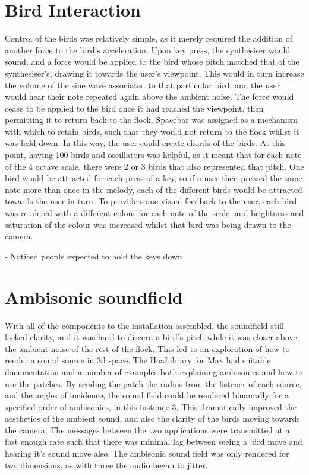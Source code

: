 \documentclass[journal, a4paper]{IEEEtran}
\begin{document}
\section*{Bird Interaction}
Control of the birds was relatively simple, as it merely required the addition of another force to the bird's acceleration. Upon key press, the synthesiser would sound, and a force would be applied to the bird whose pitch matched that of the synthesiser's, drawing it towards the user's viewpoint. This would in turn increase the volume of the sine wave associated to that particular bird, and the user would hear their note repeated again above the ambient noise. The force would cease to be applied to the bird once it had reached the viewpoint, then permitting it to return back to the flock.
Spacebar was assigned as a mechanism with which to retain birds, such that they would not return to the flock whilst it was held down. In this way, the user could create chords of the birds. At this point, having 100 birds and oscillators was helpful, as it meant that for each note of the 4 octave scale, there were 2 or 3 birds that also represented that pitch. One bird would be attracted for each press of a key, so if a user then pressed the same note more than once in the melody, each of the different birds would be attracted towards the user in turn.
To provide some visual feedback to the user, each bird was rendered with a different colour for each note of the scale, and brightness and saturation of the colour was increased whilst that bird was being drawn to the camera.

- Noticed people expected to hold the keys down

\section*{Ambisonic soundfield}
With all of the components to the installation assembled, the soundfield still lacked clarity, and it was hard to discern a bird's pitch while it was closer above the ambient noise of the rest of the flock. This led to an exploration of how to render a sound source in 3d space. The HoaLibrary \cite{hoa} for Max had suitable documentation and a number of examples both explaining ambisonics and how to use the patches. By sending the patch the radius from the listener of each source, and the angles of incidence, the sound field could be rendered binaurally for a specified order of ambisonics, in this instance 3. This dramatically improved the aesthetics of the ambient sound, and also the clarity of the birds moving towards the camera. The messages between the two applications were transmitted at a fast enough rate such that there was minimal lag between seeing a bird move and hearing it's sound move also.
The ambisonic sound field was only rendered for two dimensions, as with three the audio began to jitter.
\end{document}
